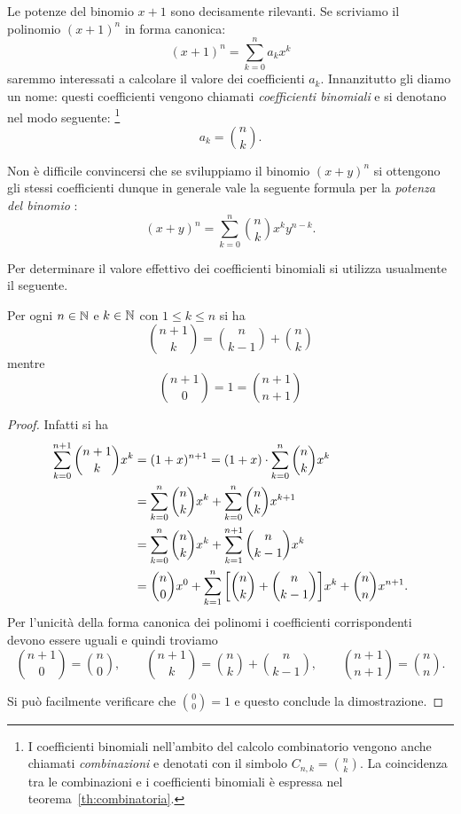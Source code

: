 Le potenze del binomio $x+1$ sono decisamente rilevanti. 
Se scriviamo il polinomio $(x+1)^n$ in forma canonica:
\[
  (x+1)^n = \sum_{k=0}^n a_k x^k  
\]
saremmo interessati a calcolare il valore
dei coefficienti $a_k$. 
Innanzitutto gli diamo un nome: questi coefficienti vengono chiamati 
\emph{coefficienti binomiali}%
%
%
e si denotano nel modo seguente:%
\footnote{%
I coefficienti binomiali nell'ambito del calcolo combinatorio 
vengono anche chiamati \emph{combinazioni}
e denotati con il simbolo $C_{n,k} = {n \choose k}$.
La coincidenza tra le combinazioni e i coefficienti binomiali 
è espressa nel teorema~\ref{th:combinatoria}.
}%
\[
    a_k = {n \choose k}.
\]

Non è difficile convincersi che se sviluppiamo il binomio $(x+y)^n$
si ottengono gli stessi coefficienti dunque
in generale vale la seguente formula per la \emph{potenza del binomio}%
%
:
% 
\begin{equation*}
  (x+y)^n = \sum_{k=0}^n {n \choose k} x^k y^{n-k}. 
\end{equation*}

Per determinare il valore effettivo dei coefficienti 
binomiali si utilizza usualmente il seguente.
  
\begin{theorem}
\mymark{*}%
\label{th:tartaglia}%
Per ogni $n\in {\mathbb N}$ e $k \in {\mathbb N}$ con $1 \le k \le n$ si ha
\[
  {n+1 \choose k} =
      {n \choose k-1} + {n \choose k}
\]
mentre
\[
  {n+1 \choose 0} = 1 = {n+1 \choose n+1}
\]
\end{theorem}
  \begin{proof}
  Infatti si ha 
  \begin{align*}
    \sum_{k=0}^{n+1} {n+1 \choose k} x^k
    &= (1+x)^{n+1} 
    = (1+x)\cdot \sum_{k=0}^n {n \choose k} x^k \\
    &= \sum_{k=0}^n {n\choose k} x^k 
    + \sum_{k=0}^n {n\choose k} x^{k+1}\\
    &= \sum_{k=0}^n {n\choose k} x^k 
    + \sum_{k=1}^{n+1} {n\choose k-1} x^{k}\\
    &= {n\choose 0} x^0 
      + \sum_{k=1}^n {\left[ {n\choose k} + {n\choose k-1} \right]} x^k
      + {n \choose n} x^{n+1}.
    \end{align*}
  Per l'unicità della forma canonica dei polinomi 
  i coefficienti corrispondenti devono essere uguali e quindi 
  troviamo
  \[
  {n+1 \choose 0} = {n \choose 0}, \qquad 
  {n+1 \choose k} = {n \choose k} + {n \choose k-1}, \qquad 
  {n+1 \choose n+1} = {n \choose n}.
  \]

  Si può facilmente verificare che  ${0 \choose 0} = 1$ 
  e questo conclude la dimostrazione.
  \end{proof}
  
